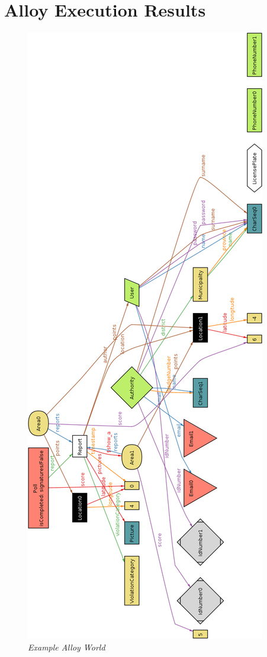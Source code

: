 \section{Alloy Execution Results}

\begin{figure}[ht!]
  \centering
  \includegraphics[origin=c,width=\textwidth,height=.95\textheight,keepaspectratio]{RASD_Images/AlloyWorlds/show.jpg}
  \caption{\textit{Example Alloy World}}
\end{figure}
\newpage

